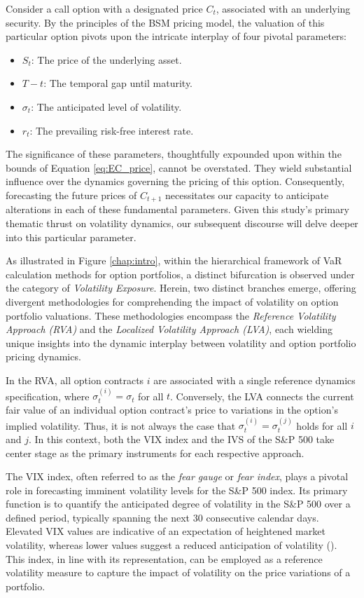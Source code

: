 Consider a call option with a designated price $C_t$, associated with an underlying security. By the principles of the BSM pricing model, the valuation of this particular option pivots upon the intricate interplay of four pivotal parameters:
\begin{itemize}
    \item $S_t$: The price of the underlying asset.
    \item $T-t$: The temporal gap until maturity.
    \item $\sigma_t$: The anticipated level of volatility.
    \item $r_t$: The prevailing risk-free interest rate.
\end{itemize}
The significance of these parameters, thoughtfully expounded upon within the bounds of Equation \eqref{eq:EC_price}, cannot be overstated. They wield substantial influence over the dynamics governing the pricing of this option. Consequently, forecasting the future prices of $C_{t+1}$ necessitates our capacity to anticipate alterations in each of these fundamental parameters. Given this study's primary thematic thrust on volatility dynamics, our subsequent discourse will delve deeper into this particular parameter.

As illustrated in Figure \ref{chap:intro}, within the hierarchical framework of VaR calculation methods for option portfolios, a distinct bifurcation is observed under the category of \textit{Volatility Exposure}. Herein, two distinct branches emerge, offering divergent methodologies for comprehending the impact of volatility on option portfolio valuations. These methodologies encompass the \textit{Reference Volatility Approach (RVA)} and the \textit{Localized Volatility Approach (LVA)}, each wielding unique insights into the dynamic interplay between volatility and option portfolio pricing dynamics.

In the RVA, all option contracts $i$ are associated with a single reference dynamics specification, where $\sigma_{t}^{(i)}=\sigma_t$ for all $t$. Conversely, the LVA connects the current fair value of an individual option contract's price to variations in the option's implied volatility. Thus, it is not always the case that $\sigma_{t}^{(i)} = \sigma_{t}^{(j)}$ holds for all $i$ and $j$. In this context, both the VIX index and the IVS of the S\&P 500 take center stage as the primary instruments for each respective approach.

The VIX index, often referred to as the \textit{fear gauge} or \textit{fear index}, plays a pivotal role in forecasting imminent volatility levels for the S\&P 500 index. Its primary function is to quantify the anticipated degree of volatility in the S\&P 500 over a defined period, typically spanning the next 30 consecutive calendar days. Elevated VIX values are indicative of an expectation of heightened market volatility, whereas lower values suggest a reduced anticipation of volatility (\cite{whaley2009understanding}). This index, in line with its representation, can be employed as a reference volatility measure to capture the impact of volatility on the price variations of a portfolio.

